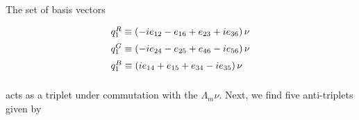 \documentclass[letterpaper,12pt,titlepage,oneside,final]{book}
\newcommand{\spacer}{0.2cm}
\begin{document}
The set of basis vectors

\begin{equation}\begin{array}{l}\label{triplet}
q^R_{1}\equiv\left(-ie_{12}-e_{16}+e_{23}+ie_{36}\right)\nu   \vspace{\spacer} \\
q^G_{1}\equiv\left(-ie_{24}-e_{25}+e_{46}-ie_{56}\right)\nu \vspace{\spacer} \\
q^B_{1}\equiv\left(ie_{14}+e_{15}+e_{34}-ie_{35}\right)\nu \vspace{\spacer} \\
\end{array}\end{equation}

\noindent acts as a triplet under commutation with the $\Lambda_m\nu$.  Next, we find five anti-triplets given by
\end{document}
